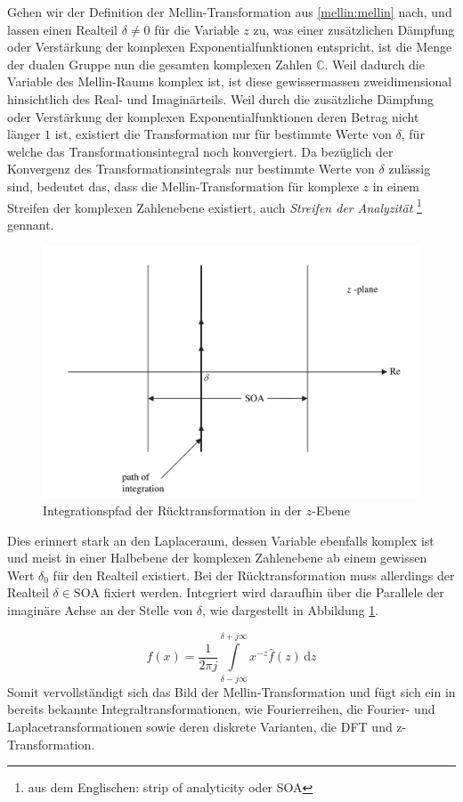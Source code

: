 Gehen wir der Definition der Mellin-Transformation aus 
\eqref{mellin:mellin} nach, und lassen einen Realteil $\delta \neq 0$ für 
die Variable $z$ zu, was einer zusätzlichen Dämpfung oder Verstärkung der 
komplexen Exponentialfunktionen entspricht, ist die Menge der dualen 
Gruppe nun die gesamten komplexen Zahlen $\mathbb{C}$.
Weil dadurch die Variable des Mellin-Raums komplex ist, ist diese 
gewissermassen zweidimensional hinsichtlich des Real- und Imaginärteils. 
Weil durch die zusätzliche Dämpfung oder Verstärkung der komplexen 
Exponentialfunktionen deren Betrag nicht länger $1$ ist, existiert die 
Transformation nur für bestimmte Werte von $\delta$, für welche das 
Transformationsintegral noch konvergiert.
Da bezüglich der Konvergenz des Transformationsintegrals nur bestimmte 
Werte von $\delta$ zulässig sind, bedeutet das, dass die 
Mellin-Transformation für komplexe $z$ in einem Streifen der komplexen 
Zahlenebene existiert, auch \emph{Streifen der Analyzität} 
\footnote{aus dem Englischen: strip of analyticity oder SOA} gennant.
\begin{figure}
    \centering
    \includegraphics[width=.5\textwidth]{papers/mellin/images/mellin_z}
    \caption{Integrationspfad der Rücktransformation in der $z$-Ebene}
    \label{fig:mellin:z}
\end{figure}
Dies erinnert stark an den Laplaceraum, dessen Variable ebenfalls komplex 
ist und meist in einer Halbebene der komplexen Zahlenebene ab einem 
gewissen Wert $\delta_0$ für den Realteil existiert.
Bei der Rücktransformation muss allerdings der Realteil 
$\delta \in \text{SOA}$ fixiert werden. 
Integriert wird daraufhin über die Parallele der imaginäre Achse an der 
Stelle von $\delta$, wie dargestellt in Abbildung \ref{fig:mellin:z}.

\begin{equation}
    f(x) = \frac{1}{2\pi j} 
    \int\limits_{\delta -j\infty}^{\delta +j\infty} 
    x^{-z} \hat{f}(z) \,\mathrm{d}z
    \label{mellin:mellininv}
\end{equation}
Somit vervollständigt sich das Bild der Mellin-Transformation und fügt 
sich ein in bereits bekannte Integraltransformationen, wie Fourierreihen, 
die Fourier- und Laplacetransformationen sowie deren diskrete Varianten, 
die DFT und z-Transformation.



